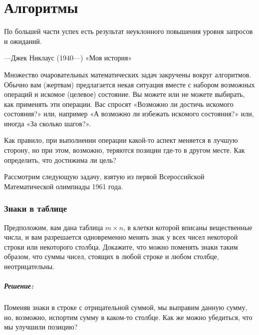 ﻿\chapter*{Алгоритмы}



\epigraph{По большей части успех есть результат неуклонного повышения уровня запросов и ожиданий.}{---Джек Никлаус (1940---) «Моя история»}

Множество очаровательных математических задач закручены вокруг алгоритмов.
Обычно вам (жертвам) предлагается некая ситуация вместе с набором возможных операций и искомое (целевое) состояние.
Вы можете или не можете выбирать, как применять эти операции.
Вас спросят «Возможно ли достичь искомого состояния?» или, например «А возможно ли избежать искомого состояния?» или, иногда «За сколько шагов?».

Как правило, при выполнении операции какой-то аспект меняется в лучшую сторону, но при этом, возможно, теряются позиции где-то в другом месте.
Как определить, что достижима ли цель?

Рассмотрим следующую задачу, взятую из первой Всероссийской Математической олимпиады 1961 года.

\subsection*{Знаки в таблице}%

Предположим, вам дана таблица $m\times n$, в клетки которой вписаны вещественные числа, и вам разрешается одновременно менять знак у всех чисел некоторой строки или некоторого столбца.
Докажите, что можно поменять знаки таким образом, что суммы чисел, стоящих в любой строке и любом столбце, неотрицательны.

\paragraph{Решение:}
Поменяв знаки в строке с отрицательной суммой, мы выправим данную сумму, но, возможно, испортим сумму в каком-то столбце.
Как же можно убедиться, что мы улучшили позицию?

